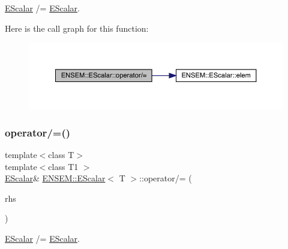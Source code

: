 \mbox{\hyperlink{classENSEM_1_1EScalar}{E\+Scalar}} /= \mbox{\hyperlink{classENSEM_1_1EScalar}{E\+Scalar}}. 

Here is the call graph for this function\+:
\nopagebreak
\begin{figure}[H]
\begin{center}
\leavevmode
\includegraphics[width=350pt]{d0/d82/classENSEM_1_1EScalar_a09524cf0f6f5baf9c421d03df58fe8d6_cgraph}
\end{center}
\end{figure}
\mbox{\label{classENSEM_1_1EScalar_a09524cf0f6f5baf9c421d03df58fe8d6}} 
\subsubsection{\texorpdfstring{operator/=()}{operator/=()}\hspace{0.1cm}{\footnotesize\ttfamily [2/2]}}
{\footnotesize\ttfamily template$<$class T$>$ \\
template$<$class T1 $>$ \\
\mbox{\hyperlink{classENSEM_1_1EScalar}{E\+Scalar}}\& \mbox{\hyperlink{classENSEM_1_1EScalar}{E\+N\+S\+E\+M\+::\+E\+Scalar}}$<$ T $>$\+::operator/= (\begin{DoxyParamCaption}\item[{const \mbox{\hyperlink{classENSEM_1_1EScalar}{E\+Scalar}}$<$ T1 $>$ \&}]{rhs }\end{DoxyParamCaption})\hspace{0.3cm}{\ttfamily [inline]}}



\mbox{\hyperlink{classENSEM_1_1EScalar}{E\+Scalar}} /= \mbox{\hyperlink{classENSEM_1_1EScalar}{E\+Scalar}}. 

